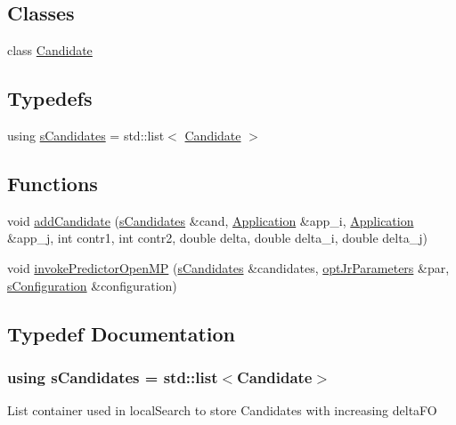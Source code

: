 \subsection*{Classes}
\begin{DoxyCompactItemize}
\item 
class \hyperlink{classCandidate}{Candidate}
\end{DoxyCompactItemize}
\subsection*{Typedefs}
\begin{DoxyCompactItemize}
\item 
using \hyperlink{candidates_8hh_af1ec7d668b0f7361dc7e1e1da5c4ce7d}{s\-Candidates} = std\-::list$<$ \hyperlink{classCandidate}{Candidate} $>$
\end{DoxyCompactItemize}
\subsection*{Functions}
\begin{DoxyCompactItemize}
\item 
void \hyperlink{candidates_8hh_a0dead9d126fdc270fa4692dc0e4671e2}{add\-Candidate} (\hyperlink{candidates_8hh_af1ec7d668b0f7361dc7e1e1da5c4ce7d}{s\-Candidates} \&cand, \hyperlink{classApplication}{Application} \&app\-\_\-i, \hyperlink{classApplication}{Application} \&app\-\_\-j, int contr1, int contr2, double delta, double delta\-\_\-i, double delta\-\_\-j)
\item 
void \hyperlink{candidates_8hh_a06a4390403bfbe9df4c986a3c8f07d28}{invoke\-Predictor\-Open\-M\-P} (\hyperlink{candidates_8hh_af1ec7d668b0f7361dc7e1e1da5c4ce7d}{s\-Candidates} \&candidates, \hyperlink{classoptJrParameters}{opt\-Jr\-Parameters} \&par, \hyperlink{readConfigurationFile_8hh_ab8f35b1da3261263c5e9c0e7c8921f5c}{s\-Configuration} \&configuration)
\end{DoxyCompactItemize}


\subsection{Typedef Documentation}
\hypertarget{candidates_8hh_af1ec7d668b0f7361dc7e1e1da5c4ce7d}{
\subsubsection[{s\-Candidates}]{\setlength{\rightskip}{0pt plus 5cm}using {\bf s\-Candidates} =  std\-::list$<${\bf Candidate}$>$}}\label{candidates_8hh_af1ec7d668b0f7361dc7e1e1da5c4ce7d}
List container used in local\-Search to store Candidates with increasing delta\-F\-O 

